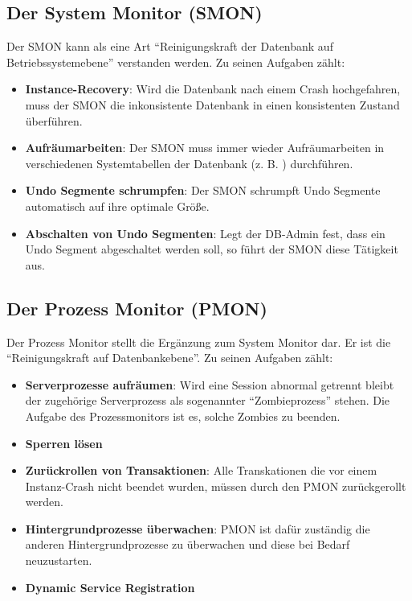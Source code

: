             \begin{literaturinternet}
              \item \cite{p665}
            \end{literaturinternet}
        \subsection{Der System Monitor (SMON)}

          Der SMON kann als eine Art \enquote{Reinigungskraft der Datenbank auf Betriebssystemebene} verstanden werden. Zu seinen Aufgaben zählt:
          \begin{itemize}
            \item \textbf{Instance-Recovery}: Wird die Datenbank nach einem Crash hochgefahren, muss der SMON die inkonsistente Datenbank in einen konsistenten Zustand überführen.
            \item \textbf{Aufräumarbeiten}: Der SMON muss immer wieder Aufräumarbeiten in verschiedenen Systemtabellen der Datenbank (z. B. ) durchführen.
            \item \textbf{Undo Segmente schrumpfen}: Der SMON schrumpft Undo Segmente automatisch auf ihre optimale Größe.
            \item \textbf{Abschalten von Undo Segmenten}: Legt der DB-Admin fest, dass ein Undo Segment abgeschaltet werden soll, so führt der SMON diese Tätigkeit aus.
          \end{itemize}
        \subsection{Der Prozess Monitor (PMON)}
          Der Prozess Monitor stellt die Ergänzung zum System Monitor dar. Er ist die \enquote{Reinigungskraft auf Datenbankebene}. Zu seinen Aufgaben zählt:

          \begin{itemize}
            \item \textbf{Serverprozesse aufräumen}: Wird eine Session abnormal getrennt bleibt der zugehörige Serverprozess als sogenannter \enquote{Zombieprozess} stehen. Die Aufgabe des Prozessmonitors ist es, solche Zombies zu beenden.
            \item \textbf{Sperren lösen}
            \item \textbf{Zurückrollen von Transaktionen}: Alle Transkationen die vor einem Instanz-Crash nicht beendet wurden, müssen durch den PMON zurückgerollt werden.
            \item \textbf{Hintergrundprozesse überwachen}: PMON ist dafür zuständig die anderen Hintergrundprozesse zu überwachen und diese bei Bedarf neuzustarten.
            \item \textbf{Dynamic Service Registration}
          \end{itemize}

